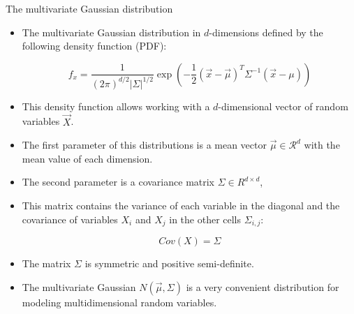 \documentclass[handout]{beamer}
\begin{document}
\begin{frame}[fragile]{The multivariate Gaussian distribution}
\scriptsize{
\begin{itemize}
 
  \item The multivariate Gaussian distribution in $d$-dimensions defined by the following density function (PDF):
  
  \begin{displaymath}
   f_x = \frac{1}{(2\pi)^{d/2}|\Sigma|^{1/2}}\exp \left( -\frac{1}{2}(\vec{x}-\vec{\mu})^T  \Sigma^{-1}(\vec{x}-\mu)\right)
  \end{displaymath}

  
\item This density function allows working with a $d$-dimensional vector of random variables $\vec{X}$.


\item The first parameter of this distributions is a mean vector $\vec{\mu} \in \mathcal{R}^d$ with the mean value of each dimension.

\item The second parameter is a covariance matrix $\Sigma \in R^{d\times d}$,

\item This matrix contains the variance of each variable in the diagonal and the covariance of variables $X_i$ and $X_j$ in the other cells $\Sigma_{i,j}$:

\begin{displaymath}
 Cov(X) = \Sigma
\end{displaymath}

\item The matrix $\Sigma$ is symmetric and positive semi-definite.
  
\item The multivariate Gaussian $N(\vec{\mu},\Sigma)$ is a very convenient distribution for modeling multidimensional random variables.
  
  
 
\end{itemize}
 

 
}
\end{frame}
\end{document}
